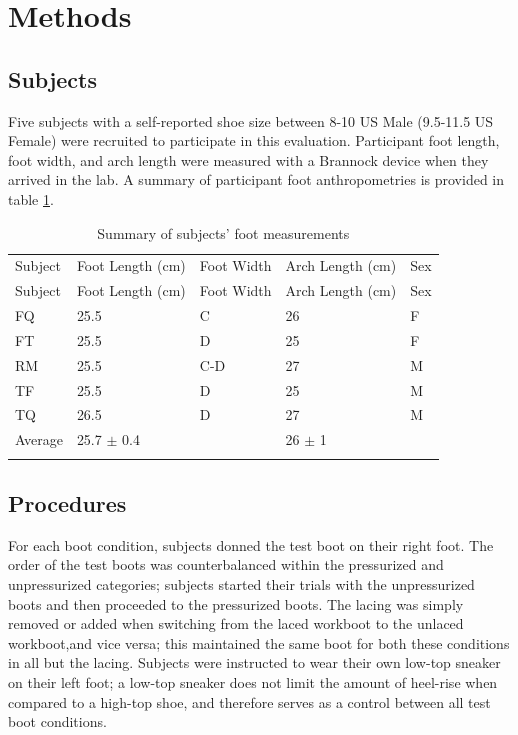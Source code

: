 \documentclass[defaultstyle,11pt]{thesis}
\begin{document}
\hypertarget{methods-3}{%
\section{Methods}\label{methods-3}}

\hypertarget{subjects-1}{%
\subsection{Subjects}\label{subjects-1}}

Five subjects with a self-reported shoe size between 8-10 US Male (9.5-11.5 US Female) were recruited to participate in this evaluation.
Participant foot length, foot width, and arch length were measured with a Brannock device when they arrived in the lab.
A summary of participant foot anthropometries is provided in table \ref{tbl:foot_meas}.

\hypertarget{tbl:foot_meas}{}
\begin{longtable}[]{@{}lllll@{}}
\caption{\label{tbl:foot_meas}Summary of subjects' foot measurements}\tabularnewline
\toprule
Subject & Foot Length (cm) & Foot Width & Arch Length (cm) & Sex \\ \addlinespace
\midrule
\endfirsthead
\toprule
Subject & Foot Length (cm) & Foot Width & Arch Length (cm) & Sex \\ \addlinespace
\midrule
\endhead
FQ & 25.5 & C & 26 & F \\ \addlinespace
FT & 25.5 & D & 25 & F \\ \addlinespace
RM & 25.5 & C-D & 27 & M \\ \addlinespace
TF & 25.5 & D & 25 & M \\ \addlinespace
TQ & 26.5 & D & 27 & M \\ \addlinespace
Average & 25.7 \(\pm\) 0.4 & & 26 \(\pm\) 1 & \\ \addlinespace
\bottomrule
\end{longtable}

\hypertarget{procedures}{%
\subsection{Procedures}\label{procedures}}

For each boot condition, subjects donned the test boot on their right foot.
The order of the test boots was counterbalanced within the pressurized and unpressurized categories; subjects started their trials with the unpressurized boots and then proceeded to the pressurized boots.
The lacing was simply removed or added when switching from the laced workboot to the unlaced workboot,and vice versa; this maintained the same boot for both these conditions in all but the lacing.
Subjects were instructed to wear their own low-top sneaker on their left foot; a low-top sneaker does not limit the amount of heel-rise when compared to a high-top shoe, and therefore serves as a control between all test boot conditions.
\end{document}
